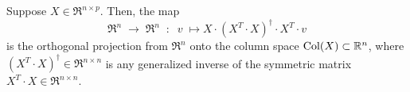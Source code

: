\begin{theorem}
\mbox{}\vskip 0.1cm\noindent
Suppose $X \in \Re^{n \times p}$.
Then, the map
\begin{equation*}
\Re^{n} \; \longrightarrow \; \Re^{n}
\;\; : \;\;
v \; \longmapsto X \cdot (X^{T} \cdot X)^{\dagger} \cdot X^{T} \cdot v
\end{equation*}
is the orthogonal projection from $\Re^{n}$ onto the column space
$\textnormal{Col}(X) \subset \mathbb{R}^{n}$, where
$(X^{T} \cdot X)^{\dagger} \in \Re^{n \times n}$ is any generalized inverse of the symmetric
matrix $X^{T} \cdot X \in \Re^{n \times n}$.
\end{theorem}


